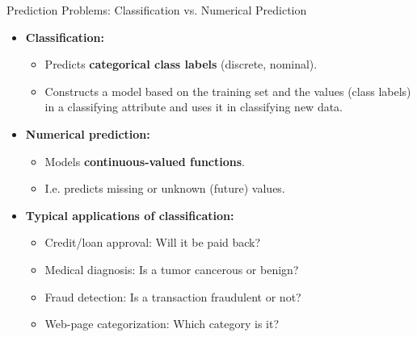 \begin{frame}{Prediction Problems: Classification vs. Numerical Prediction}
  \begin{itemize}
  \item \textbf{Classification:}
    \begin{itemize}
    \item Predicts \textbf{\color{airforceblue}categorical class labels} (discrete, nominal).
    \item Constructs a model based on the training set and the values (class labels) in a classifying attribute and uses it in classifying new data.
    \end{itemize}
  \item \textbf{Numerical prediction:}
    \begin{itemize}
    \item Models \textbf{\color{airforceblue}continuous-valued functions}.
    \item I.e. predicts missing or unknown (future) values.
    \end{itemize}
  \item \textbf{Typical applications of classification:}
    \begin{itemize}
    \item Credit/loan approval: Will it be paid back?
    \item Medical diagnosis: Is a tumor cancerous or benign?
    \item Fraud detection: Is a transaction fraudulent or not?
    \item Web-page categorization: Which category is it?
    \end{itemize}
  \end{itemize}
\end{frame}

